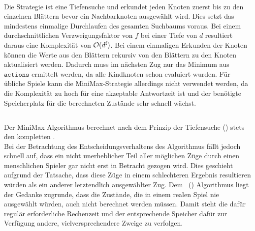 \vspace{0.5cm}\\ Die Strategie ist eine Tiefensuche und erkundet jeden Knoten zuerst bis zu den einzelnen Blättern bevor ein Nachbarknoten ausgewählt wird. Dies setzt das mindestens einmalige Durchlaufen des gesamten Suchbaums voraus. Bei einem durchschnittlichen Verzweigungsfaktor von $f$ bei einer Tiefe von $d$ resultiert daraus eine Komplexität von $\mathcal{O}(d\textsuperscript{f})$. Bei einem einmaligen Erkunden der Knoten können die Werte aus den Blättern rekursiv von den Blättern zu den Knoten aktualisiert werden. Dadurch muss im nächsten Zug nur das Minimum aus $\mathtt{actions}$ ermittelt werden, da alle Kindknoten schon evaluiert wurden. Für übliche Spiele kann die MiniMax-Strategie allerdings nicht verwendet werden, da die Komplexität zu hoch für eine akzeptable Antwortzeit ist und der benötigte Speicherplatz für die berechneten Zustände sehr schnell wächst.

\subsection{\abab}
\label{ab-pruning}
\authormax
Der MiniMax Algorithmus berechnet nach dem Prinzip der Tiefensuche () stets den kompletten \gtree. 
\\Bei der Betrachtung des Entscheidungsverhaltens des Algorithmus fällt jedoch schnell auf, dass ein nicht unerheblicher Teil aller möglichen Züge durch einen menschlichen Spieler gar nicht erst in Betracht gezogen wird. Dies geschieht aufgrund der Tatsache, dass diese Züge in einem schlechteren Ergebnis resultieren würden als ein anderer letztendlich ausgewählter Zug.\newline
Dem \abab\ (\abp) Algorithmus liegt der Gedanke zugrunde, dass die Zustände, die in einem realen Spiel nie ausgewählt würden, auch nicht berechnet werden müssen. Damit steht die dafür regulär erforderliche Rechenzeit und der entsprechende Speicher dafür zur Verfügung andere, vielversprechendere Zweige zu verfolgen.
